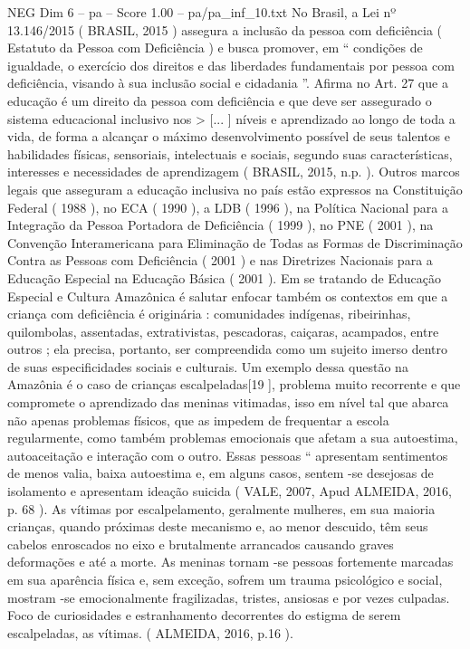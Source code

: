 \begin{textsample}{NEG Dim 6 – pa – Score 1.00 – pa/pa\_inf\_10.txt}
No Brasil, a Lei nº 13.146/2015 ( BRASIL, 2015 ) assegura a inclusão da pessoa com deficiência ( Estatuto da Pessoa com Deficiência ) e busca promover, em “ condições de igualdade, o exercício dos direitos e das liberdades fundamentais por pessoa com deficiência, visando à sua inclusão social e cidadania ”.
Afirma no Art. 27 que a educação é um direito da pessoa com deficiência e que deve ser assegurado o sistema educacional inclusivo nos > [... ] níveis e aprendizado ao longo de toda a vida, de forma a alcançar o máximo desenvolvimento possível de seus talentos e habilidades físicas, sensoriais, intelectuais e sociais, segundo suas características, interesses e necessidades de aprendizagem ( BRASIL, 2015, n.p. ).
Outros marcos legais que asseguram a educação inclusiva no país estão expressos na Constituição Federal ( 1988 ), no ECA ( 1990 ), a LDB ( 1996 ), na Política Nacional para a Integração da Pessoa Portadora de Deficiência ( 1999 ), no PNE ( 2001 ), na Convenção Interamericana para Eliminação de Todas as Formas de Discriminação Contra as Pessoas com Deficiência ( 2001 ) e nas Diretrizes Nacionais para a Educação Especial na Educação Básica ( 2001 ).
Em se tratando de Educação Especial e Cultura Amazônica é salutar enfocar também os contextos em que a criança com deficiência é originária : comunidades indígenas, ribeirinhas, quilombolas, assentadas, extrativistas, pescadoras, caiçaras, acampados, entre outros ; ela precisa, portanto, ser compreendida como um sujeito imerso dentro de suas especificidades sociais e culturais.
Um exemplo dessa questão na Amazônia é o caso de crianças escalpeladas[19 ], problema muito recorrente e que compromete o aprendizado das meninas vitimadas, isso em nível tal que abarca não apenas problemas físicos, que as impedem de frequentar a escola regularmente, como também problemas emocionais que afetam a sua autoestima, autoaceitação e interação com o outro.
Essas pessoas “ apresentam sentimentos de menos valia, baixa autoestima e, em alguns casos, sentem -se desejosas de isolamento e apresentam ideação suicida ( VALE, 2007, Apud ALMEIDA, 2016, p. 68 ).
As vítimas por escalpelamento, geralmente mulheres, em sua maioria crianças, quando próximas deste mecanismo e, ao menor descuido, têm seus cabelos enroscados no eixo e brutalmente arrancados causando graves deformações e até a morte.
As meninas tornam -se pessoas fortemente marcadas em sua aparência física e, sem exceção, sofrem um trauma psicológico e social, mostram -se emocionalmente fragilizadas, tristes, ansiosas e por vezes culpadas.
Foco de curiosidades e estranhamento decorrentes do estigma de serem escalpeladas, as vítimas. ( ALMEIDA, 2016, p.16 ).

\end{textsample}
